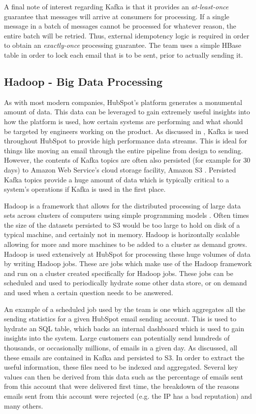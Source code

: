 A final note of interest regarding Kafka is that it provides an \textit{at-least-once} guarantee that messages will arrive at consumers for processing. If a single message in a batch of messages cannot be processed for whatever reason, the entire batch will be retried. Thus, external idempotency logic is required in order to obtain an \textit{exactly-once} processing guarantee. The \team{} team uses a simple HBase table in order to lock each email that is to be sent, prior to actually sending it. 

\subsection{Hadoop - Big Data Processing}\label{sec:hadoop}
 As with most modern companies, HubSpot's platform generates a monumental amount of data. This data can be leveraged to gain extremely useful insights into how the platform is used, how certain systems are performing and what should be targeted by engineers working on the product. As discussed in , Kafka is used throughout HubSpot to provide high performance data streams. This is ideal for things like moving an email through the entire pipeline from design to sending. However, the contents of Kafka topics are often also persisted (for example for 30 days) to Amazon Web Service's cloud storage facility, Amazon S3 \cite{s3} . Persisted Kafka topics provide a huge amount of data which is typically critical to a system's operations if Kafka is used in the first place. 
 
 Hadoop is a framework that allows for the distributed processing of large data sets across clusters of computers using simple programming models \cite{hadoop}. Often times the size of the datasets persisted to S3 would be too large to hold on disk of a typical machine, and certainly not in memory. Hadoop is horizontally scalable allowing for more and more machines to be added to a cluster as demand grows. Hadoop is used extensively at HubSpot for processing these huge volumes of data by writing Hadoop jobs. These are jobs which make use of the Hadoop framework and run on a cluster created specifically for Hadoop jobs. These jobs can be scheduled and used to periodically hydrate some other data store, or on demand and used when a certain question needs to be answered. 
 
 An example of a scheduled job used by the \team{} team is one which aggregates all the sending statistics for a given HubSpot email sending account. This is used to hydrate an SQL table, which backs an internal dashboard which is used to gain insights into the system. Large customers can potentially send hundreds of thousands, or occasionally millions, of emails in a given day. As discussed, all these emails are contained in Kafka and persisted to S3. In order to extract the useful information, these files need to be indexed and aggregated. Several key values can then be derived from this data such as the percentage of emails sent from this account that were delivered first time, the breakdown of the reasons emails sent from this account were rejected (e.g. the IP has a bad reputation) and many others.

